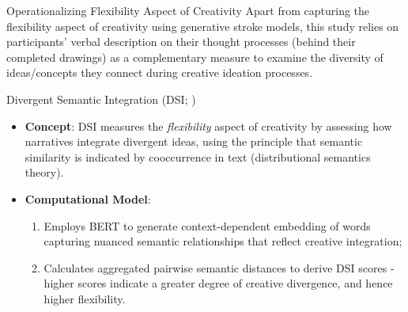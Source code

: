 \documentclass[pdf]{beamer}
\begin{document}
\begin{frame}{Operationalizing Flexibility Aspect of Creativity}
Apart from capturing the flexibility aspect of creativity using generative stroke models, this study relies on participants' \alert{verbal description on their thought processes} (behind their completed drawings) as a complementary measure to examine the diversity of ideas/concepts they connect during creative ideation processes. 
\end{frame}

\begin{frame}{Divergent Semantic Integration (DSI; \cite{johnson_divergent_2022})}
\begin{itemize}
    \item<1-> \textbf{Concept}: DSI measures the \textit{flexibility} aspect of creativity by assessing how narratives integrate divergent ideas, using the principle that semantic similarity is indicated by cooccurrence in text (\alert{distributional semantics theory}).
    \item<2-> \textbf{Computational Model}: 
        \begin{enumerate}
            \item Employs BERT to generate context-dependent embedding of words capturing nuanced semantic relationships that reflect creative integration;
            \item Calculates aggregated pairwise semantic distances to derive DSI scores - higher scores indicate a greater degree of creative divergence, and hence higher flexibility.
        \end{enumerate}
\end{itemize}
\end{frame}

\end{document}
